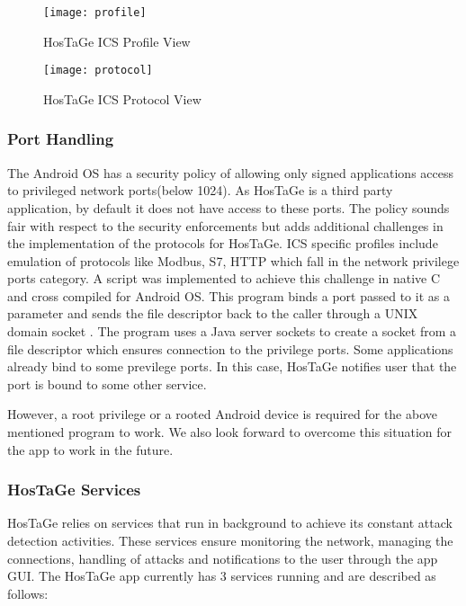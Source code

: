 \documentclass[article,msc=informatik,type=msc,colorback,accentcolor=tud9c]{tudthesis}
\begin{document}
       
       \begin{figure}[H]
       \centering
       \begin{minipage}{.5\textwidth}
         \centering
         \texttt{[image: profile]}
         \caption[HosTaGe ICS Profile View]{HosTaGe ICS Profile View}
         \label{fig:HosTaGe ICS Profile View}
       \end{minipage}%
       \begin{minipage}{.5\textwidth}
         \centering
         \texttt{[image: protocol]}
         \caption[HosTaGe ICS Protocol View]{HosTaGe ICS Protocol View}
         \label{fig:HosTaGe ICS Protocol View}
       \end{minipage}
       \end{figure}
       
     
       
       \vspace{5mm} 
       \subsubsection{Port Handling}\label{Port Handling}
       The Android \ac{OS} has a security policy of allowing only signed applications access to privileged network ports(below 1024). As HosTaGe is a third party application, by default it does not have access to these ports. The policy sounds fair with respect to the security enforcements but adds additional challenges in the implementation of the protocols for HosTaGe. \ac{ICS} specific profiles include emulation of protocols like Modbus, \ac{S7}, HTTP which fall in the network privilege ports category. A script was implemented to achieve this challenge in native C and cross compiled for Android OS. This program binds a port passed to it as a parameter and sends the file descriptor back to the caller through a UNIX domain socket\cite{Vasilomanolakis:2013:TNI:2516760.2516763} . The program uses a Java server sockets to create a socket from a file descriptor which ensures connection to the privilege ports. Some applications already bind to some previlege ports. In this case, HosTaGe notifies user that the port is bound to some other service. 
       
       
       However, a root privilege or a rooted Android device is required for the above mentioned program to work. We also look forward to overcome this situation for the app to work in the future. 
        \vspace{5mm} 
       \subsubsection{HosTaGe Services}\label{HosTaGe Services}
       HosTaGe relies on services that run in background to achieve its constant attack detection activities. These services ensure monitoring the network, managing the connections, handling of attacks and notifications to the user through the app \ac{GUI}. The HosTaGe app currently has 3 services running and are described as follows:
       
\end{document}
